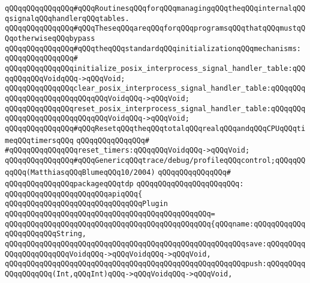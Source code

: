 \verb|qQQqqQQqqQQqqQQq#qQQqRoutinesqQQqforqQQqmanagingqQQqtheqQQqinternalqQQqsignalqQQqhandlerqQQqtables.|\newline
\verb|qQQqqQQqqQQqqQQq#qQQqTheseqQQqareqQQqforqQQqprogramsqQQqthatqQQqmustqQQqotherwiseqQQqbypass|\newline
\verb|qQQqqQQqqQQqqQQq#qQQqtheqQQqstandardqQQqinitializationqQQqmechanisms:|\newline
\verb|qQQqqQQqqQQqqQQq#|\newline
\verb|qQQqqQQqqQQqqQQqinitialize_posix_interprocess_signal_handler_table:qQQqqQQqqQQqVoidqQQq->qQQqVoid;|\newline
\verb|qQQqqQQqqQQqqQQqclear_posix_interprocess_signal_handler_table:qQQqqQQqqQQqqQQqqQQqqQQqqQQqqQQqVoidqQQq->qQQqVoid;|\newline
\verb|qQQqqQQqqQQqqQQqreset_posix_interprocess_signal_handler_table:qQQqqQQqqQQqqQQqqQQqqQQqqQQqqQQqVoidqQQq->qQQqVoid;|\newline
\newline
\verb|qQQqqQQqqQQqqQQq#qQQqResetqQQqtheqQQqtotalqQQqrealqQQqandqQQqCPUqQQqtimeqQQqtimersqQQq|\newline
\verb|qQQqqQQqqQQqqQQq#|\newline
\verb|#qQQqqQQqqQQqqQQqreset_timers:qQQqqQQqVoidqQQq->qQQqVoid;|\newline
\newline
\verb|qQQqqQQqqQQqqQQq#qQQqGenericqQQqtrace/debug/profileqQQqcontrol;qQQqqQQqqQQq(MatthiasqQQqBlumeqQQq10/2004)|\newline
\verb|qQQqqQQqqQQqqQQq#|\newline
\verb|qQQqqQQqqQQqqQQqpackageqQQqtdp|\newline
\verb|qQQqqQQqqQQqqQQqqQQqqQQq:|\newline
\verb|qQQqqQQqqQQqqQQqqQQqqQQqapiqQQq{|\newline
\verb|qQQqqQQqqQQqqQQqqQQqqQQqqQQqqQQqPlugin|\newline
\verb|qQQqqQQqqQQqqQQqqQQqqQQqqQQqqQQqqQQqqQQqqQQqqQQq=|\newline
\verb|qQQqqQQqqQQqqQQqqQQqqQQqqQQqqQQqqQQqqQQqqQQqqQQq{qQQqname:qQQqqQQqqQQqqQQqqQQqqQQqString,|\newline
\verb|qQQqqQQqqQQqqQQqqQQqqQQqqQQqqQQqqQQqqQQqqQQqqQQqqQQqqQQqsave:qQQqqQQqqQQqqQQqqQQqqQQqVoidqQQq->qQQqVoidqQQq->qQQqVoid,|\newline
\verb|qQQqqQQqqQQqqQQqqQQqqQQqqQQqqQQqqQQqqQQqqQQqqQQqqQQqqQQqpush:qQQqqQQqqQQqqQQqqQQq(Int,qQQqInt)qQQq->qQQqVoidqQQq->qQQqVoid,|\newline
